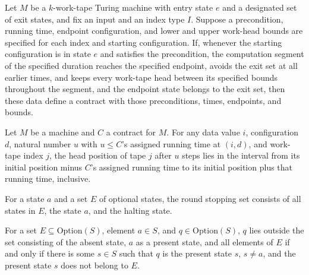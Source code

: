 \begin{definition}
\label{Turing.Contract.ofSegment}
\leanok
{}
Let $M$ be a $k$-work-tape Turing machine with entry state $e$ and a designated set of
exit states, and fix an input and an index type $I$. Suppose a precondition, running
time, endpoint configuration, and lower and upper work-head bounds are specified for
each index and starting configuration. If, whenever the starting configuration is in
state $e$ and satisfies the precondition, the computation segment of the specified
duration reaches the specified endpoint, avoids the exit set at all earlier times, and
keeps every work-tape head between its specified bounds throughout the segment, and the
endpoint state belongs to the exit set, then these data define a contract with those
preconditions, times, endpoints, and bounds.
\end{definition}

\begin{theorem}
\label{Turing.Contract.time_envelope}
\leanok
{}
Let $M$ be a machine and $C$ a contract for $M$. For any data value $i$, configuration
$d$, natural number $u$ with $u\le C$’s assigned running time at $(i,d)$, and work-tape
index $j$, the head position of tape $j$ after $u$ steps lies in the interval from its
initial position minus $C$’s assigned running time to its initial position plus that
running time, inclusive.
\end{theorem}

\begin{definition}
\label{Turing.roundStop}
\leanok
For a state $a$ and a set $E$ of optional states, the round stopping set consists of all
states in $E$, the state $a$, and the halting state.
\end{definition}

\begin{theorem}
\label{Turing.not_mem_roundStop}
\leanok
{}
For a set $E\subseteq\mathrm{Option}(S)$, element $a\in S$, and
$q\in\mathrm{Option}(S)$, $q$ lies outside the set consisting of the absent state, $a$
as a present state, and all elements of $E$ if and only if there is some $s\in S$ such
that $q$ is the present state $s$, $s\ne a$, and the present state $s$ does not belong
to $E$.
\end{theorem}


